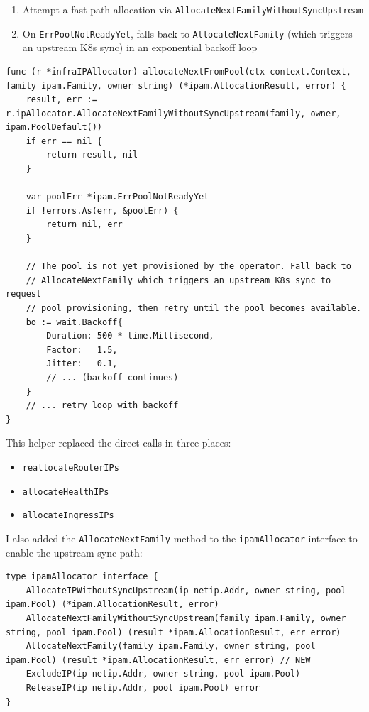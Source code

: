 \begin{enumerate}
\item Attempt a fast-path allocation via \texttt{AllocateNextFamilyWithoutSyncUpstream}

\item On \texttt{ErrPoolNotReadyYet}, falls back to \texttt{AllocateNextFamily} (which triggers an upstream K8s sync) in an exponential backoff loop
\end{enumerate}

\begin{verbatim}
func (r *infraIPAllocator) allocateNextFromPool(ctx context.Context, family ipam.Family, owner string) (*ipam.AllocationResult, error) {
    result, err := r.ipAllocator.AllocateNextFamilyWithoutSyncUpstream(family, owner, ipam.PoolDefault())
    if err == nil {
        return result, nil
    }

    var poolErr *ipam.ErrPoolNotReadyYet
    if !errors.As(err, &poolErr) {
        return nil, err
    }

    // The pool is not yet provisioned by the operator. Fall back to
    // AllocateNextFamily which triggers an upstream K8s sync to request
    // pool provisioning, then retry until the pool becomes available.
    bo := wait.Backoff{
        Duration: 500 * time.Millisecond,
        Factor:   1.5,
        Jitter:   0.1,
        // ... (backoff continues)
    }
    // ... retry loop with backoff
}
\end{verbatim}

This helper replaced the direct calls in three places:

\begin{itemize}
\item \texttt{reallocateRouterIPs}

\item \texttt{allocateHealthIPs}

\item \texttt{allocateIngressIPs}
\end{itemize}

I also added the \texttt{AllocateNextFamily} method to the \texttt{ipamAllocator} interface to enable the upstream sync path:

\begin{verbatim}
type ipamAllocator interface {
    AllocateIPWithoutSyncUpstream(ip netip.Addr, owner string, pool ipam.Pool) (*ipam.AllocationResult, error)
    AllocateNextFamilyWithoutSyncUpstream(family ipam.Family, owner string, pool ipam.Pool) (result *ipam.AllocationResult, err error)
    AllocateNextFamily(family ipam.Family, owner string, pool ipam.Pool) (result *ipam.AllocationResult, err error) // NEW
    ExcludeIP(ip netip.Addr, owner string, pool ipam.Pool)
    ReleaseIP(ip netip.Addr, pool ipam.Pool) error
}
\end{verbatim}

